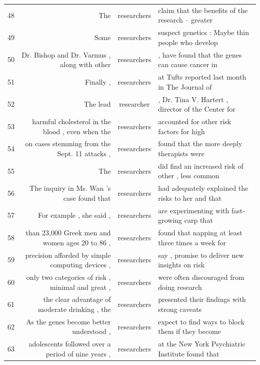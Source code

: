 {\begin{table}
\begin{tabular}{|lrcl|}
48 & The                                                & researchers & claim that the benefits of the research -- greater \\
49 & Some                                               & researchers & suspect genetics : Maybe thin people who develop   \\
50 & Dr. Bishop and Dr. Varmus , along with other       & researchers & , have found that the genes can cause cancer in    \\
51 & Finally ,                                          & researchers & at Tufts reported last month in The Journal of     \\
52 & The lead                                           & researcher  & , Dr. Tina V. Hartert , director of the Center for \\
53 & harmful cholesterol in the blood , even when the   & researchers & accounted for other risk factors for high          \\
54 & on cases stemming from the Sept. 11 attacks ,      & researchers & found that the more deeply therapists were         \\
55 & The                                                & researchers & did find an increased risk of other , less common  \\
56 & The inquiry in Ms. Wan 's case found that          & researchers & had adequately explained the risks to her and that \\
57 & For example , she said ,                           & researchers & are experimenting with fast-growing carp that      \\
58 & than 23,000 Greek men and women ages 20 to 86 ,    & researchers & found that napping at least three times a week for \\
59 & precision afforded by simple computing devices ,   & researchers & say , promise to deliver new insights on risk      \\
60 & only two categories of risk , minimal and great ,  & researchers & were often discouraged from doing research         \\
61 & the clear advantage of moderate drinking , the     & researchers & presented their findings with strong caveats       \\
62 & As the genes become better understood ,            & researchers & expect to find ways to block them if they become   \\
63 & adolescents followed over a period of nine years , & researchers & at the New York Psychiatric Institute found that   \\

\end{tabular}
\end{table}}
